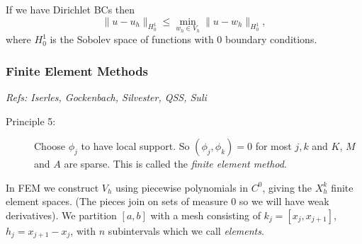 \documentclass[12pt, a4paper]{article}
\theoremstyle{definition}
\theoremstyle{remark}
\numberwithin{equation}{section}
\begin{document}
If we have Dirichlet BCs then
\begin{equation*}
\|u-u_h\|_{H_0^1} \le  \min\limits_{w_h\in V_h} \|u-w_{h}\|_{H_0^1},
\end{equation*}
where $H_0^1$ is the Sobolev space of functions with 0 boundary conditions. 

\subsubsection{Finite Element Methods}
\emph{Refs: Iserles, Gockenbach, Silvester, QSS, Suli}

\begin{description}
\item [Principle 5:] Choose $\phi_j$ to have local support. So $( \phi_j,\phi_k )=0$ for most $j,k$ and $K$, $M$ and $A$ are sparse. This is called the \emph{finite element method}.
\end{description}


In FEM we construct $V_h$ using piecewise polynomials in $C^0$, giving the $X^k_h$ finite element spaces. (The pieces join on sets of measure 0 so we will have weak derivatives).
We partition $[a,b]$ with a mesh consisting of $k_j=[x_j,x_{j+1}]$, $h_j=x_{j+1}-x_j$, with $n$ subintervals which we call \emph{elements}.
\end{document}
